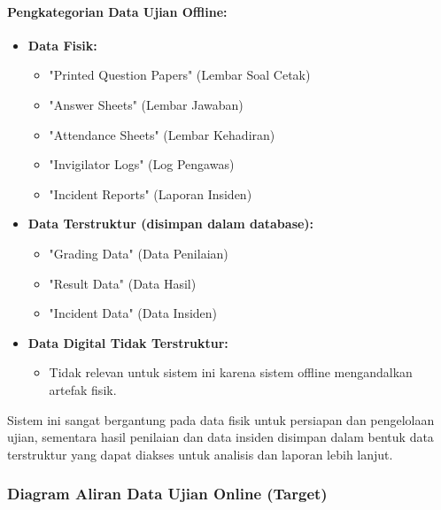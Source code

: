 \paragraph{Pengkategorian Data Ujian Offline:}
\begin{itemize}
	\item \textbf{Data Fisik:}
	\begin{itemize}
		\item "Printed Question Papers" (Lembar Soal Cetak)
		\item "Answer Sheets" (Lembar Jawaban)
		\item "Attendance Sheets" (Lembar Kehadiran)
		\item "Invigilator Logs" (Log Pengawas)
		\item "Incident Reports" (Laporan Insiden)
	\end{itemize}
	\item \textbf{Data Terstruktur (disimpan dalam database):}
	\begin{itemize}
		\item "Grading Data" (Data Penilaian)
		\item "Result Data" (Data Hasil)
		\item "Incident Data" (Data Insiden)
	\end{itemize}
	\item \textbf{Data Digital Tidak Terstruktur:}
	\begin{itemize}
		\item Tidak relevan untuk sistem ini karena sistem offline mengandalkan artefak fisik.
	\end{itemize}
\end{itemize}

Sistem ini sangat bergantung pada data fisik untuk persiapan dan pengelolaan ujian, sementara hasil penilaian dan data insiden disimpan dalam bentuk data terstruktur yang dapat diakses untuk analisis dan laporan lebih lanjut.

\subsubsection{Diagram Aliran Data Ujian Online (Target)}


